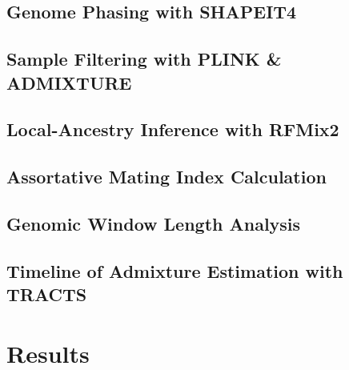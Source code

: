 \documentclass[11pt]{article}
\begin{document}
\subsection{Genome Phasing with SHAPEIT4}





\subsection{Sample Filtering with PLINK \& ADMIXTURE}





\subsection{Local-Ancestry Inference with RFMix2}




\subsection{Assortative Mating Index Calculation}



\subsection{Genomic Window Length Analysis}




\subsection{Timeline of Admixture Estimation with TRACTS}



















\section{Results}

\end{document}
